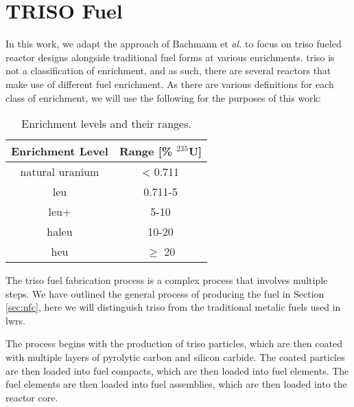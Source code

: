 \section{TRISO Fuel}
\label{sec:triso_fuel}

In this work, we adapt the approach of Bachmann et \textit{al.} \cite{bachmann_enrichment_2021} to focus on \gls{triso} fueled reactor designs alongside traditional fuel forms at various enrichments. \gls{triso} is not a classification of enrichment, and as such, there are several reactors that make use of different fuel enrichment. As there are various definitions for each class of enrichment, we will use the following for the purposes of this work:

\begin{table}[htbp]
   \centering
   \caption{Enrichment levels and their ranges.}
   \label{tab:enrichment_levels}
   \begin{tabular}{c c}
      \hline
      \textbf{Enrichment Level} & \textbf{Range [\%  $^{235}$U]} \\
      \hline
      natural uranium & < 0.711 \\
      \gls{leu} & 0.711-5 \\
      \gls{leu+} & 5-10 \\
      \gls{haleu} & 10-20 \\
      \gls{heu} & $\geq$ 20  \\
      \hline
   \end{tabular}
\end{table}

The \gls{triso} fuel fabrication process is a complex process that involves multiple steps. We have outlined the general process of producing the fuel in Section \ref{sec:nfc}, here we will distinguish \gls{triso} from the traditional metalic fuels used in \glspl{lwr}.


The process begins with the production of \gls{triso} particles, which are then coated with multiple layers of pyrolytic carbon and silicon carbide. The coated particles are then loaded into fuel compacts, which are then loaded into fuel elements. The fuel elements are then loaded into fuel assemblies, which are then loaded into the reactor core.